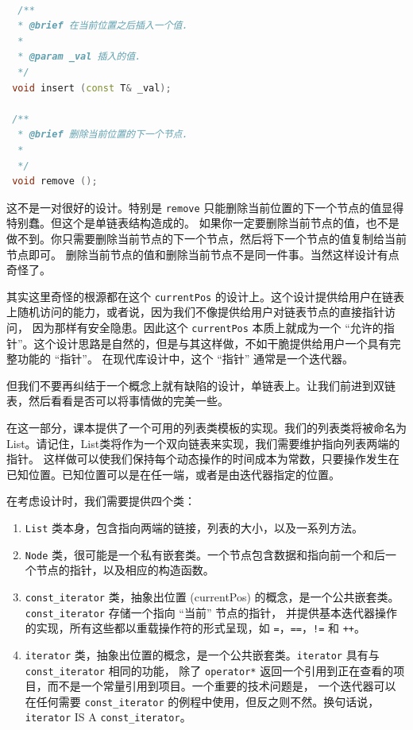 \documentclass[a4paper]{ctexart}
\theoremstyle{definition}
\theoremstyle{definition}
\begin{document}
\begin{lstlisting}[language=C++]

  /**
  * @brief 在当前位置之后插入一个值.
  * 
  * @param _val 插入的值.
  */
 void insert (const T& _val);

 /**
  * @brief 删除当前位置的下一个节点.
  * 
  */
 void remove ();

\end{lstlisting}

这不是一对很好的设计。特别是 \verb|remove| 只能删除当前位置的下一个节点的值显得特别蠢。但这个是单链表结构造成的。
如果你一定要删除当前节点的值，也不是做不到。你只需要删除当前节点的下一个节点，然后将下一个节点的值复制给当前节点即可。
删除当前节点的值和删除当前节点不是同一件事。当然这样设计有点奇怪了。

其实这里奇怪的根源都在这个 \verb|currentPos| 的设计上。这个设计提供给用户在链表上随机访问的能力，或者说，因为我们不像提供给用户对链表节点的直接指针访问，
因为那样有安全隐患。因此这个 \verb|currentPos| 本质上就成为一个 ``允许的指针''。这个设计思路是自然的，但是与其这样做，不如干脆提供给用户一个具有完整功能的 ``指针''。
在现代库设计中，这个 ``指针'' 通常是一个迭代器。

但我们不要再纠结于一个概念上就有缺陷的设计，单链表上。让我们前进到双链表，然后看看是否可以将事情做的完美一些。

在这一部分，课本提供了一个可用的列表类模板的实现。我们的列表类将被命名为 List。请记住，List类将作为一个双向链表来实现，我们需要维护指向列表两端的指针。
这样做可以使我们保持每个动态操作的时间成本为常数，只要操作发生在已知位置。已知位置可以是在任一端，或者是由迭代器指定的位置。

在考虑设计时，我们需要提供四个类：
\begin{enumerate}
  \item \verb|List| 类本身，包含指向两端的链接，列表的大小，以及一系列方法。
  \item \verb|Node| 类，很可能是一个私有嵌套类。一个节点包含数据和指向前一个和后一个节点的指针，以及相应的构造函数。
  \item \verb|const_iterator| 类，抽象出位置 (currentPos) 的概念，是一个公共嵌套类。\verb|const_iterator| 存储一个指向 ``当前'' 节点的指针，
  并提供基本迭代器操作的实现，所有这些都以重载操作符的形式呈现，如 \verb|=|，\verb|==|，\verb|!=| 和 \verb|++|。
  \item \verb|iterator| 类，抽象出位置的概念，是一个公共嵌套类。\verb|iterator| 具有与 \verb|const_iterator| 相同的功能，
  除了 \verb|operator*| 返回一个引用到正在查看的项目，而不是一个常量引用到项目。一个重要的技术问题是，
  一个迭代器可以在任何需要 \verb|const_iterator| 的例程中使用，但反之则不然。换句话说，\verb|iterator| IS A \verb|const_iterator|。
\end{enumerate}
\end{document}
